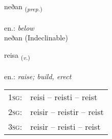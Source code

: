 \documentclass[frontgrid, backgrid]{flacards}\usepackage[]{graphicx}\usepackage[]{xcolor}
\begin{document}

\renewcommand{\flhead}{\vskip5pt \fboxsep=0pt {\small\bfseries\footnotesize Forsetning | Preposition}}
\renewcommand{\fcfoot}{\vskip5pt \fboxsep=0pt \hspace{2pt}{\small\bfseries\footnotesize 2K}}

\renewcommand{\blhead}{\vskip5pt {\small\bfseries\footnotesize Forsetning | Preposition }}
\renewcommand{\bcfoot}{\vskip5pt \hspace{2pt}{\small\bfseries\footnotesize 2K}}


{neðan \small{\textsubscript{(\textit{prep.})}} \\[1ex]
\textphonetic{[nɛːðan]} \\
en.: \emph{below} \\  [2ex]
neðan (Indeclinable)}

\renewcommand{\flhead}{\vskip5pt \fboxsep=0pt {\small\bfseries\footnotesize Sagnorð | Verb}}
\renewcommand{\fcfoot}{\vskip5pt \fboxsep=0pt \hspace{2pt}{\small\bfseries\footnotesize 2K}}

\renewcommand{\blhead}{\vskip5pt {\small\bfseries\footnotesize Sagnorð | Verb }}
\renewcommand{\bcfoot}{\vskip5pt \hspace{2pt}{\small\bfseries\footnotesize 2K}}


{reisa \small{\textsubscript{(\textit{v.})}} \\[1ex] %
\textphonetic{[reiːsa]} \\
en.: \emph{raise; build, erect} \\  [2ex]
\renewcommand*{\arraystretch}{0.8}
\begin{tabular}{p{1cm}l}
\textsc{1sg}: & reisi -- reisti -- reist \\ 
\textsc{2sg}: & reisir -- reistir -- reist \\ 
\textsc{3sg}: & reisir -- reisti -- reist \\ 
\end{tabular}
}

\renewcommand{\flhead}{\vskip5pt \fboxsep=0pt {\small\bfseries\footnotesize Nafnorð | Noun}}
\renewcommand{\fcfoot}{\vskip5pt \fboxsep=0pt \hspace{2pt}{\small\bfseries\footnotesize 2K}}
\end{document}
